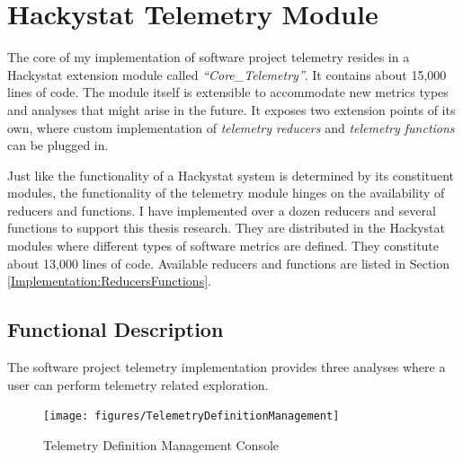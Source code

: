 
\section{Hackystat Telemetry Module} \label{Implementation:Telemetry}

The core of my implementation of software project telemetry resides in a Hackystat extension module called \textit{``Core\_Telemetry''}. It contains about 15,000 lines of code. The module itself is extensible to accommodate new metrics types and analyses that might arise in the future. It exposes two extension points of its own, where custom implementation of \textit{telemetry reducers} and \textit{telemetry functions} can be plugged in. 

Just like the functionality of a Hackystat system is determined by its constituent modules, the functionality of the telemetry module hinges on the availability of reducers and functions. I have implemented over a dozen reducers and several functions to support this thesis research. They are distributed in the Hackystat modules where different types of software metrics are defined. They constitute about 13,000 lines of code. Available reducers and functions are listed in Section \ref{Implementation:ReducersFunctions}.



\subsection{Functional Description} \label{Implementation:Telemetry:FunctionalDescription}

The software project telemetry implementation provides three analyses where a user can perform telemetry related exploration. 

\begin{figure}[tbp]
  \texttt{[image: figures/TelemetryDefinitionManagement]}
  \caption{Telemetry Definition Management Console} 
  \label{fig:TelemetryDefinitionManagement}
\end{figure}

